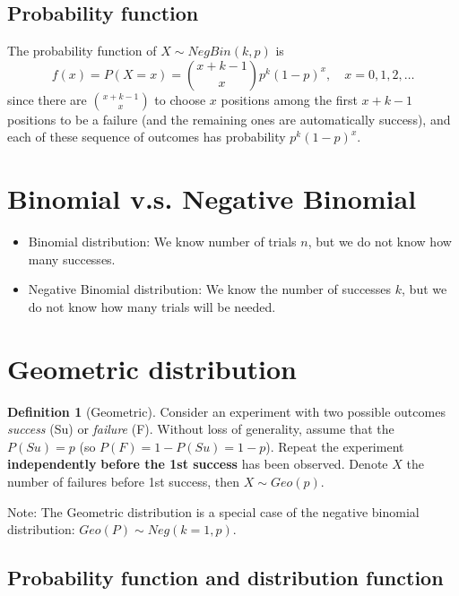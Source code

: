 \documentclass[
]{book}
\theoremstyle{definition}
\newtheorem{definition}{Definition}[chapter]
\theoremstyle{definition}
\theoremstyle{definition}
\theoremstyle{definition}
\theoremstyle{remark}
\begin{document}
\subsection{Probability function}\label{probability-function}

The probability function of \(X\sim NegBin(k,p)\) is
\[ f(x)=P(X=x)=\binom{x+k-1}{x}p^k(1-p)^x,\quad x=0,1,2,\dots\]
since there are \(\binom{x+k-1}{x}\) to choose \(x\) positions among the first \(x+k-1\) positions to be a failure (and the remaining ones are automatically success), and each of these sequence of outcomes has probability \(p^k(1-p)^x\).

\section{Binomial v.s. Negative Binomial}\label{binomial-v.s.-negative-binomial}

\begin{itemize}
\item
  Binomial distribution: We know number of trials \(n\), but we do not know how many successes.
\item
  Negative Binomial distribution: We know the number of successes \(k\), but we do not know how many trials will be needed.
\end{itemize}

\section{Geometric distribution}\label{geometric-distribution}

\begin{definition}[Geometric]
Consider an experiment with two possible outcomes \emph{success} (Su) or \emph{failure} (F). Without loss of generality, assume that the \(P(Su)=p\) (so \(P(F)=1-P(Su)= 1-p\)). Repeat the experiment \textbf{independently} \textbf{before the 1st success} has been observed. Denote \(X\) the number of failures before 1st success, then \(X\sim Geo(p)\).
\end{definition}

Note: The Geometric distribution is a special case of the negative binomial distribution: \(Geo(P) \sim Neg(k=1,p)\).

\subsection{Probability function and distribution function}\label{probability-function-and-distribution-function-1}
\end{document}
